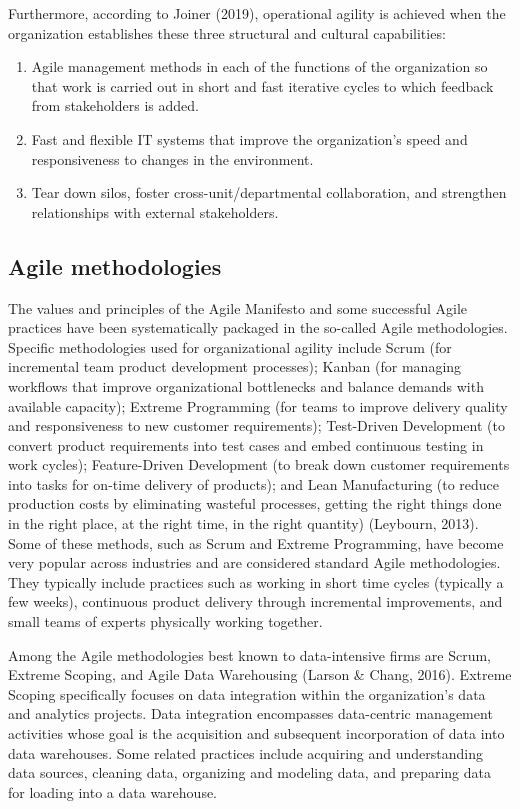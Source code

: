 \documentclass[
  letterpaper,
  DIV=11,
  numbers=noendperiod]{scrreprt}
\begin{document}
Furthermore, according to Joiner (2019), operational agility is achieved
when the organization establishes these three structural and cultural
capabilities:

\begin{enumerate}
\def\labelenumi{\arabic{enumi}.}
\item
  Agile management methods in each of the functions of the organization
  so that work is carried out in short and fast iterative cycles to
  which feedback from stakeholders is added.
\item
  Fast and flexible IT systems that improve the organization's speed and
  responsiveness to changes in the environment.
\item
  Tear down silos, foster cross-unit/departmental collaboration, and
  strengthen relationships with external stakeholders.
\end{enumerate}

\hypertarget{agile-methodologies}{%
\subsection{Agile methodologies}\label{agile-methodologies}}

The values and principles of the Agile Manifesto and some successful
Agile practices have been systematically packaged in the so-called Agile
methodologies. Specific methodologies used for organizational agility
include Scrum (for incremental team product development processes);
Kanban (for managing workflows that improve organizational bottlenecks
and balance demands with available capacity); Extreme Programming (for
teams to improve delivery quality and responsiveness to new customer
requirements); Test-Driven Development (to convert product requirements
into test cases and embed continuous testing in work cycles);
Feature-Driven Development (to break down customer requirements into
tasks for on-time delivery of products); and Lean Manufacturing (to
reduce production costs by eliminating wasteful processes, getting the
right things done in the right place, at the right time, in the right
quantity) (Leybourn, 2013). Some of these methods, such as Scrum and
Extreme Programming, have become very popular across industries and are
considered standard Agile methodologies. They typically include
practices such as working in short time cycles (typically a few weeks),
continuous product delivery through incremental improvements, and small
teams of experts physically working together.

Among the Agile methodologies best known to data-intensive firms are
Scrum, Extreme Scoping, and Agile Data Warehousing (Larson \& Chang,
2016). Extreme Scoping specifically focuses on data integration within
the organization's data and analytics projects. Data integration
encompasses data-centric management activities whose goal is the
acquisition and subsequent incorporation of data into data warehouses.
Some related practices include acquiring and understanding data sources,
cleaning data, organizing and modeling data, and preparing data for
loading into a data warehouse.
\end{document}
